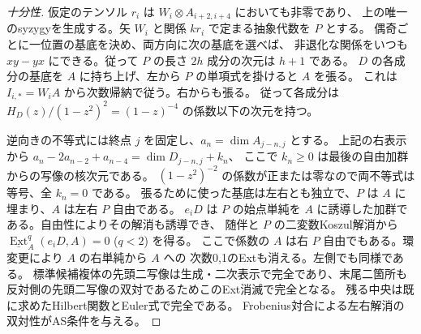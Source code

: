 \begin{proof}[十分性]
仮定のテンソル $r_i$ は $W_i\otimes A_{i+2,i+4}$ においても非零であり、
上の唯一のsyzygyを生成する。矢 $W_i$ と関係 $kr_i$ で定まる抽象代数を $P$ とする。
偶奇ごとに一位置の基底を決め、両方向に次の基底を選べば、
非退化な関係をいつも $x y-y x$ にできる。従って $P$ の長さ $2h$ 成分の次元は $h+1$ である。
$D$ の各成分の基底を $A$ に持ち上げ、左から $P$ の単項式を掛けると $A$ を張る。
これは $I_{i,*}=W_i A$ から次数帰納で従う。右からも張る。
従って各成分は $H_D(z)/(1-z^2)^2=(1-z)^{-4}$ の係数以下の次元を持つ。

逆向きの不等式には終点 $j$ を固定し、$a_n=\dim A_{j-n,j}$ とする。
上記の右表示から $a_n-2a_{n-2}+a_{n-4}=\dim D_{j-n,j}+k_n$、
ここで $k_n\ge0$ は最後の自由加群からの写像の核次元である。
$(1-z^2)^{-2}$ の係数が正または零なので両不等式は等号、全 $k_n=0$ である。
張るために使った基底は左右とも独立で、$P$ は $A$ に埋まり、$A$ は左右 $P$ 自由である。
$e_i D$ は $P$ の始点単純を $A$ に誘導した加群である。自由性によりその解消も誘導でき、
随伴と $P$ の二変数Koszul解消から $\underline{\operatorname{Ext}}_A^q(e_iD,A)=0$ ($q<2$) を得る。
ここで係数の $A$ は右 $P$ 自由でもある。環変更により $A$ の右単純から $A$ への
次数0,1のExtも消える。左側でも同様である。
標準候補複体の先頭二写像は生成・二次表示で完全であり、末尾二箇所も
反対側の先頭二写像の双対であるためこのExt消滅で完全となる。
残る中央は既に求めたHilbert関数とEuler式で完全である。
Frobenius対合による左右解消の双対性がAS条件を与える。
\end{proof}

